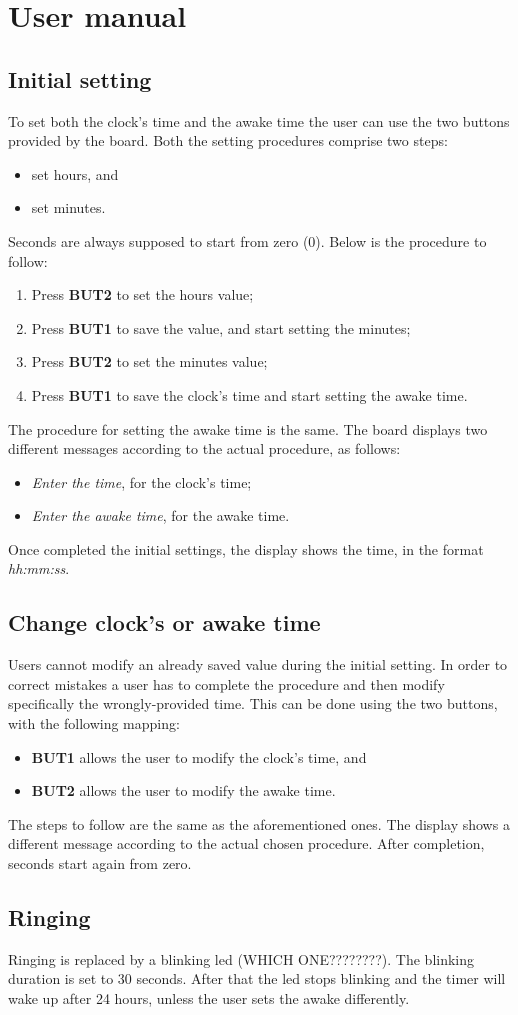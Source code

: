 \section{User manual}
\subsection{Initial setting}
To set both the clock's time and the awake time the user can use the two buttons provided by the board. Both the setting procedures comprise two steps:
\begin{itemize}
	\item set hours, and
	\item set minutes.
\end{itemize}
Seconds are always supposed to start from zero (0). Below is the procedure to follow:
\begin{enumerate}
	\item Press \textbf{BUT2} to set the hours value;
	\item Press \textbf{BUT1} to save the value, and start setting the minutes;
	\item Press \textbf{BUT2} to set the minutes value;
	\item Press \textbf{BUT1} to save the clock's time and start setting the awake time.
\end{enumerate}
The procedure for setting the awake time is the same. The board displays two different messages according to the actual procedure, as follows:
\begin{itemize}
	\item \textit{Enter the time}, for the clock's time;
	\item \textit{Enter the awake time}, for the awake time.
\end{itemize}
Once completed the initial settings, the display shows the time, in the format \textit{hh:mm:ss}. 

\subsection{Change clock's or awake time}
Users cannot modify an already saved value during the initial setting. In order to correct mistakes a user has to complete the procedure and then modify specifically the wrongly-provided time. This can be done using the two buttons, with the following mapping:
\begin{itemize}
	\item \textbf{BUT1} allows the user to modify the clock's time, and
	\item \textbf{BUT2} allows the user to modify the awake time.
\end{itemize}
The steps to follow are the same as the aforementioned ones. The display shows a different message according to the actual chosen procedure. After completion, seconds start again from zero. 

\subsection{Ringing}
Ringing is replaced by a blinking led (WHICH ONE????????). The blinking duration is set to 30 seconds. After that the led stops blinking and the timer will wake up after 24 hours, unless the user sets the awake differently.


